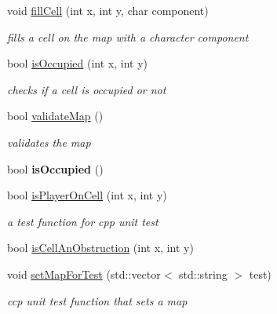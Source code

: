 \begin{DoxyCompactItemize}
void \hyperlink{class_map_editor_engine_a8e791a3027cb744fe72587f0d2521f97}{fill\+Cell} (int x, int y, char component)
\begin{DoxyCompactList}\small\item\em fills a cell on the map with a character component \end{DoxyCompactList}\item 
\hypertarget{class_map_editor_engine_ab06dd22cc63e93a5d773bb8519e893d6}{}\label{class_map_editor_engine_ab06dd22cc63e93a5d773bb8519e893d6} 
bool \hyperlink{class_map_editor_engine_ab06dd22cc63e93a5d773bb8519e893d6}{is\+Occupied} (int x, int y)
\begin{DoxyCompactList}\small\item\em checks if a cell is occupied or not \end{DoxyCompactList}\item 
\hypertarget{class_map_editor_engine_a2c3dc1650663b3fd732204c44a0c6468}{}\label{class_map_editor_engine_a2c3dc1650663b3fd732204c44a0c6468} 
bool \hyperlink{class_map_editor_engine_a2c3dc1650663b3fd732204c44a0c6468}{validate\+Map} ()
\begin{DoxyCompactList}\small\item\em validates the map \end{DoxyCompactList}\item 
\hypertarget{class_map_editor_engine_a72ae16b219adeb12ffc71057769cbf2d}{}\label{class_map_editor_engine_a72ae16b219adeb12ffc71057769cbf2d} 
bool {\bfseries is\+Occupied} ()
\item 
\hypertarget{class_map_editor_engine_a6cb1311e775978847a2e8f3db740def8}{}\label{class_map_editor_engine_a6cb1311e775978847a2e8f3db740def8} 
bool \hyperlink{class_map_editor_engine_a6cb1311e775978847a2e8f3db740def8}{is\+Player\+On\+Cell} (int x, int y)
\begin{DoxyCompactList}\small\item\em a test function for cpp unit test \end{DoxyCompactList}\item 
bool \hyperlink{class_map_editor_engine_aa8f2eec7f99782943317f61e0ff98123}{is\+Cell\+An\+Obstruction} (int x, int y)
\item 
\hypertarget{class_map_editor_engine_abf76a8fa555a228743caae9e5e1ff037}{}\label{class_map_editor_engine_abf76a8fa555a228743caae9e5e1ff037} 
void \hyperlink{class_map_editor_engine_abf76a8fa555a228743caae9e5e1ff037}{set\+Map\+For\+Test} (std\+::vector$<$ std\+::string $>$ test)
\begin{DoxyCompactList}\small\item\em ccp unit test function that sets a map \end{DoxyCompactList}\item 

\end{DoxyCompactItemize}
